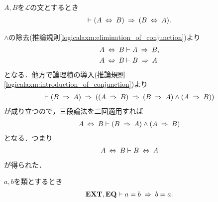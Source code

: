 	\begin{screen}
		\begin{logicalthm}[同値関係の対称律]
		\label{logicalthm:symmetry_of_equivalence_arrows}
			$A,B$を$\mathcal{L}$の文とするとき
			\begin{align}
				\vdash (A \lrarrow B) \rarrow (B \lrarrow A).
			\end{align}
		\end{logicalthm}
	\end{screen}
	
	\begin{prf}
		$\wedge$の除去(推論規則\ref{logicalaxm:elimination_of_conjunction})より
		\begin{align}
			A \lrarrow B &\vdash A \rarrow B, \\
			A \lrarrow B &\vdash B \rarrow A
		\end{align}
		となる．他方で論理積の導入(推論規則\ref{logicalaxm:introduction_of_conjunction})より
		\begin{align}
			\vdash (B \rarrow A) \rarrow ((A \rarrow B) \rarrow 
			(B \rarrow A) \wedge (A \rarrow B))
		\end{align}
		が成り立つので，三段論法を二回適用すれば
		\begin{align}
			A \lrarrow B \vdash (B \rarrow A) \wedge (A \rarrow B)
		\end{align}
		となる．つまり
		\begin{align}
			A \lrarrow B \vdash B \lrarrow A
		\end{align}
		が得られた．
		\QED
	\end{prf}
	
	\begin{screen}
		\begin{thm}[(ボツ!!!)等号の対称律]\label{thm:symmetry_of_equality}
			$a,b$を類とするとき
			\begin{align}
				\EXTAX,\EQAX \vdash a = b \rarrow b = a.
			\end{align}
		\end{thm}
	\end{screen}
	
